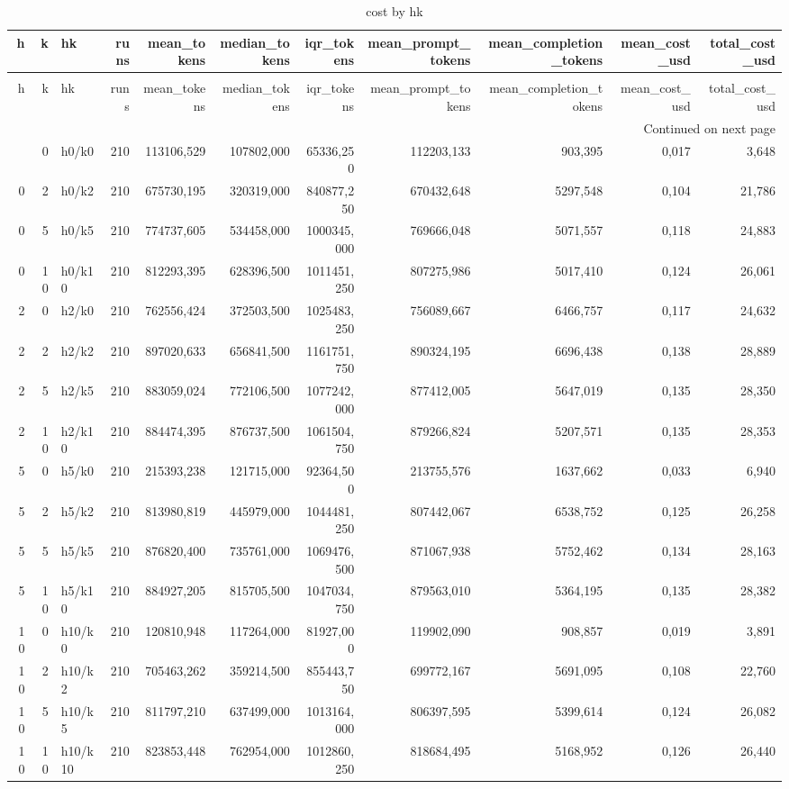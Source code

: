 \begin{longtable}{rrlrrrrrrrr}
\caption{cost by hk} \label{tab:cost_by_hk} \\
\toprule
h & k & hk & runs & mean\_tokens & median\_tokens & iqr\_tokens & mean\_prompt\_tokens & mean\_completion\_tokens & mean\_cost\_usd & total\_cost\_usd \\
\midrule
\endfirsthead
\caption[]{cost by hk} \\
\toprule
h & k & hk & runs & mean\_tokens & median\_tokens & iqr\_tokens & mean\_prompt\_tokens & mean\_completion\_tokens & mean\_cost\_usd & total\_cost\_usd \\
\midrule
\endhead
\midrule
\multicolumn{11}{r}{Continued on next page} \\
\midrule
\endfoot
\bottomrule
\endlastfoot
0 & 0 & h0/k0 & 210 & 113106,529 & 107802,000 & 65336,250 & 112203,133 & 903,395 & 0,017 & 3,648 \\
0 & 2 & h0/k2 & 210 & 675730,195 & 320319,000 & 840877,250 & 670432,648 & 5297,548 & 0,104 & 21,786 \\
0 & 5 & h0/k5 & 210 & 774737,605 & 534458,000 & 1000345,000 & 769666,048 & 5071,557 & 0,118 & 24,883 \\
0 & 10 & h0/k10 & 210 & 812293,395 & 628396,500 & 1011451,250 & 807275,986 & 5017,410 & 0,124 & 26,061 \\
2 & 0 & h2/k0 & 210 & 762556,424 & 372503,500 & 1025483,250 & 756089,667 & 6466,757 & 0,117 & 24,632 \\
2 & 2 & h2/k2 & 210 & 897020,633 & 656841,500 & 1161751,750 & 890324,195 & 6696,438 & 0,138 & 28,889 \\
2 & 5 & h2/k5 & 210 & 883059,024 & 772106,500 & 1077242,000 & 877412,005 & 5647,019 & 0,135 & 28,350 \\
2 & 10 & h2/k10 & 210 & 884474,395 & 876737,500 & 1061504,750 & 879266,824 & 5207,571 & 0,135 & 28,353 \\
5 & 0 & h5/k0 & 210 & 215393,238 & 121715,000 & 92364,500 & 213755,576 & 1637,662 & 0,033 & 6,940 \\
5 & 2 & h5/k2 & 210 & 813980,819 & 445979,000 & 1044481,250 & 807442,067 & 6538,752 & 0,125 & 26,258 \\
5 & 5 & h5/k5 & 210 & 876820,400 & 735761,000 & 1069476,500 & 871067,938 & 5752,462 & 0,134 & 28,163 \\
5 & 10 & h5/k10 & 210 & 884927,205 & 815705,500 & 1047034,750 & 879563,010 & 5364,195 & 0,135 & 28,382 \\
10 & 0 & h10/k0 & 210 & 120810,948 & 117264,000 & 81927,000 & 119902,090 & 908,857 & 0,019 & 3,891 \\
10 & 2 & h10/k2 & 210 & 705463,262 & 359214,500 & 855443,750 & 699772,167 & 5691,095 & 0,108 & 22,760 \\
10 & 5 & h10/k5 & 210 & 811797,210 & 637499,000 & 1013164,000 & 806397,595 & 5399,614 & 0,124 & 26,082 \\
10 & 10 & h10/k10 & 210 & 823853,448 & 762954,000 & 1012860,250 & 818684,495 & 5168,952 & 0,126 & 26,440 \\
\end{longtable}
